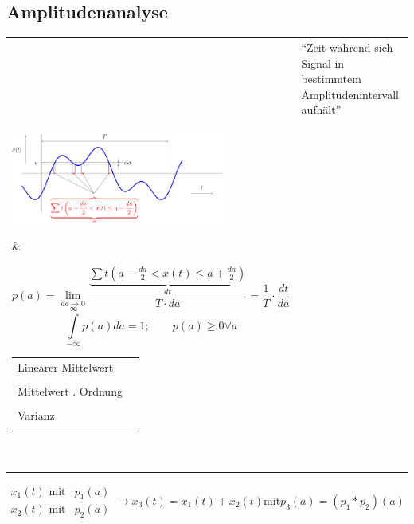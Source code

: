 \subsection{Amplitudenanalyse }
\begin{tabular}{ll}
	& ``Zeit während sich Signal in bestimmtem Amplitudenintervall aufhält'' \\
\parbox{7cm}{
	\includegraphics[width=7cm]{./bilder/amplitudenanalyse.png}
	}
	& \begin{minipage}[]{11cm}
			$$p(a) = \lim_{da\rightarrow 0}\frac{\underbrace{\sum t\left(
			a-\frac{da}{2}<x(t)\leq a+\frac{da}{2}\right)}_{dt}}{T\cdot da} = \frac{1}{T}\cdot
			\frac{dt}{da}$$
			$$\int\limits_{-\infty}^{\infty} p(a) da = 1; \qquad p(a) \geq 0 \forall a$$
			
			\begin{tabular}{ll}
            Linearer Mittelwert 
            	& \fbox{$X_0  = \int\limits_{-\infty}^{\infty}a\cdot p(a)da$} \\ \\ 
            Mittelwert $n$. Ordnung 
            	& \fbox{$X^n = \int\limits_{-\infty}^{\infty}a^n\cdot p(a)da$} \\ \\
						Varianz
							& \fbox{$Var(x) = \int\limits_{-\infty}^{\infty}(a-X_0)^2\cdot p(a) da$} \\ \\
            \end{tabular}
      \end{minipage} \\
\end{tabular}

$\begin{array}{ll}
	x_1(t) \text{ mit} & p_1(a) \\
	x_2(t) \text{ mit} & p_2(a)
\end{array} 
\rightarrow x_3(t) = x_1(t) + x_2(t) \text{mit} p_3(a) = (p_1 \ast p_2)(a)$


